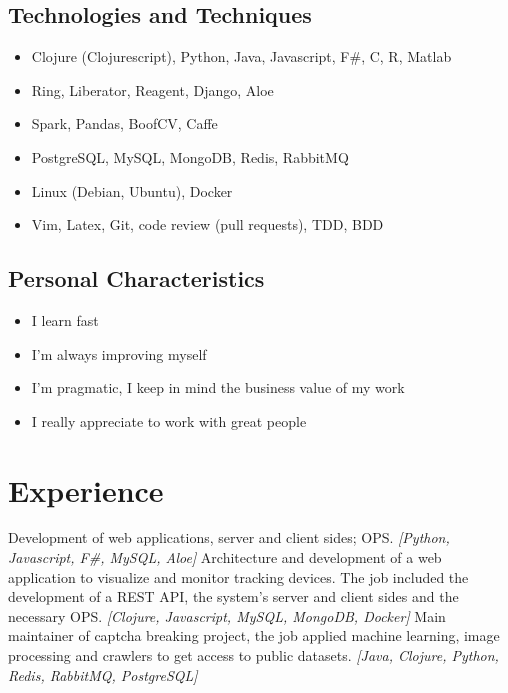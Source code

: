 \documentclass[letterpaper]{twentysecondcv} %
\begin{document}
\subsection{Technologies and Techniques}

\begin{itemize}
    \item Clojure (Clojurescript), Python, Java, Javascript, F\#, C, R, Matlab
    \item Ring, Liberator, Reagent, Django, Aloe
    \item Spark, Pandas, BoofCV, Caffe
    \item PostgreSQL, MySQL, MongoDB, Redis, RabbitMQ
    \item Linux (Debian, Ubuntu), Docker
    \item Vim, Latex, Git, code review (pull requests), TDD, BDD
\end{itemize}

\subsection{Personal Characteristics}

\begin{itemize}
    \item I learn fast
    \item I'm always improving myself
    \item I'm pragmatic, I keep in mind the business value of my work
    \item I really appreciate to work with great people
\end{itemize}


\section{Experience}

\begin{twenty} %
	{Development of web applications, server and client sides; OPS.
	\emph{[Python, Javascript, F\#, MySQL, Aloe]}}
	{Architecture and development of a web application to visualize and monitor tracking
	devices. The job included the development of a REST API, the system's server and
	client sides and the necessary OPS.
	\emph{[Clojure, Javascript, MySQL, MongoDB, Docker]}}
	{Main maintainer of captcha breaking project, the job applied machine learning, image
	processing and crawlers to get access to public datasets.
	\emph{[Java, Clojure, Python, Redis, RabbitMQ, PostgreSQL]}}
\end{twenty}
\end{document}
